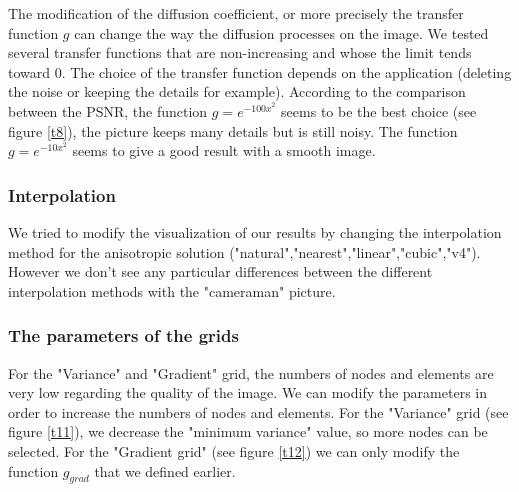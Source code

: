 \documentclass{report}
\begin{document}
The modification of the diffusion coefficient, or more precisely the transfer function $g$ can change the way the diffusion processes on the image. We tested several transfer functions that are non-increasing and whose the limit tends toward 0. The choice of the transfer function depends on the application (deleting the noise or keeping the details for example). According to the comparison between the PSNR, the function $g= e^{-{100 x}^2}$ seems to be the best choice (see figure \ref{t8}), the picture keeps many details but is still noisy. The function $g= e^{-{10 x}^2}$ seems to give a good result with a smooth image.  \\












\subsubsection{Interpolation}

We tried to modify the visualization of our results by changing the interpolation method for the anisotropic solution ("natural","nearest","linear","cubic","v4"). However we don't see any particular differences between the different interpolation methods with the "cameraman" picture. 




\subsubsection{The parameters of the grids}

For the "Variance" and "Gradient" grid, the numbers of nodes and elements are very low regarding the quality of the image. We can modify the parameters in order to increase the numbers of nodes and elements. 
For the "Variance" grid (see figure \ref{t11}), we decrease the "minimum variance" value, so more nodes can be selected. For the "Gradient grid" (see figure \ref{t12}) we can only modify the function $g_{grad}$ that we defined earlier. 
\end{document}
